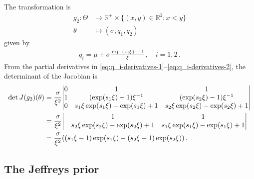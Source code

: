\documentclass{article}
\DeclarePairedDelimiter\abs{\lvert}{\rvert}
\newcommand{\R}{\mathbb{R}}
\begin{document}
%
The transformation is
%
\begin{align*}
	g_2 \colon \Theta &\to \R^+ \times \{(x, y) \in \R^2 \colon x < y\} \\
	\theta &\mapsto (\sigma, q_{1}, q_{2})
\end{align*}
%
given by
%
\begin{align*}
	q_i = \mu + \sigma \frac{\exp(s_i \xi) - 1}{\xi} \,, \quad i = 1, 2 \,.
\end{align*}
%
From the partial derivatives in
\eqref{eq:q_i-derivatives-1}--\eqref{eq:q_i-derivatives-2},
the determinant of the Jacobian is
%
\begin{align*}
	\det J(g_2)(\theta)
	&= \frac{\sigma}{\xi ^ 2} \abs*{
			\begin{matrix}
			0 &1 &1 \\
			1 &(\exp(s_1 \xi) - 1)\xi ^ {-1} &(\exp(s_2 \xi) - 1)\xi^{-1}  \\
			0 &s_1 \xi \exp(s_1 \xi) -\exp(s_1 \xi) + 1
				&s_2 \xi \exp(s_2 \xi) -\exp(s_2 \xi) + 1 \\
			\end{matrix} } \\
	&= \frac{\sigma}{\xi ^ 2} \abs*{
			\begin{matrix}
			&1 &1 \\
			&s_2 \xi \exp(s_2 \xi) -\exp(s_2 \xi) + 1
				&s_1 \xi \exp(s_1 \xi) -\exp(s_1 \xi) + 1 \\
			\end{matrix} } \\
	&= \frac{\sigma}{\xi ^ {2} }
		((s_1 \xi - 1) \exp(s_1 \xi) - (s_2 \xi - 1) \exp(s_2 \xi)) \,.
\end{align*}
%
\subsection{The Jeffreys prior}
\label{appendix:jeffreys}
%
\end{document}
